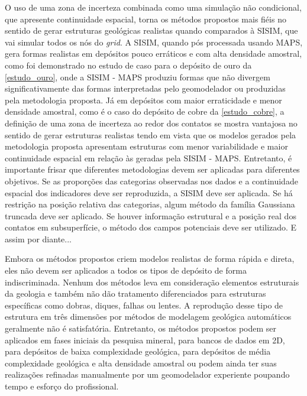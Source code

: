 O uso de uma zona de incerteza combinada como uma simulação não condicional, que apresente continuidade espacial, torna os métodos propostos mais fiéis no sentido de gerar estruturas geológicas realistas quando comparados à SISIM, que vai simular todos os nós do \textit{grid}. A SISIM, quando pós processada usando MAPS, gera formas realistas em depósitos pouco erráticos e com alta densidade amostral, como foi demonstrado no estudo de caso para o depósito de ouro da \autoref{estudo_ouro}, onde a SISIM - MAPS produziu formas que não divergem significativamente das formas interpretadas pelo geomodelador ou produzidas pela metodologia proposta. Já em depósitos com maior erraticidade e menor densidade amostral, como é o caso do depósito de cobre da \autoref{estudo_cobre}, a definição de uma zona de incerteza ao redor dos contatos se mostra vantajosa no sentido de gerar estruturas realistas tendo em vista que os modelos gerados pela metodologia proposta apresentam estruturas com menor variabilidade e maior continuidade espacial em relação às geradas pela SISIM - MAPS. Entretanto, é importante frisar que diferentes metodologias devem ser aplicadas para diferentes objetivos. Se as proporções das categorias observadas nos dados e a continuidade espacial dos indicadores deve ser reproduzida, a SISIM deve ser aplicada. Se há restrição na posição relativa das categorias, algum método da família Gaussiana truncada deve ser aplicado. Se houver informação estrutural e a posição real dos contatos em subsuperfície, o método dos campos potenciais deve ser utilizado. E assim por diante...

Embora os métodos propostos criem modelos realistas de forma rápida e direta, eles não devem ser aplicados a todos os tipos de depósito de forma indiscriminada. Nenhum dos métodos leva em consideração elementos estruturais da geologia e também não dão tratamento diferenciados para estruturas específicas como dobras, diques, falhas ou lentes. A reprodução desse tipo de estrutura em três dimensões por métodos de modelagem geológica automáticos geralmente não é satisfatória. Entretanto, os métodos propostos podem ser aplicados em fases iniciais da pesquisa mineral, para bancos de dados em 2D, para depósitos de baixa complexidade geológica, para depósitos de média complexidade geológica e alta densidade amostral ou podem ainda ter suas realizações refinadas manualmente por um geomodelador experiente poupando tempo e esforço do profissional.  

